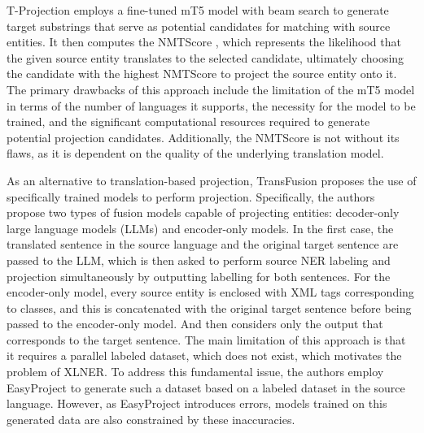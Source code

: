 T-Projection \cite{garcia-ferrero-etal-2023-projection} employs a fine-tuned mT5 \cite{xue-etal-2021-mt5}
model with beam search to generate target substrings that serve as potential candidates for matching
with source entities. It then computes the NMTScore \cite{vamvas_sennrich_2022_nmtscore}, which
represents the likelihood that the given source entity translates to the selected candidate, ultimately
choosing the candidate with the highest NMTScore to project the source entity onto it. The primary
drawbacks of this approach include the limitation of the mT5 model in terms of the number of languages
it supports, the necessity for the model to be trained, and the significant computational resources
required to generate potential projection candidates. Additionally, the NMTScore is not without its
flaws, as it is dependent on the quality of the underlying translation model.

As an alternative to translation-based projection, TransFusion \cite{transfusion} proposes the use of
specifically trained models to perform projection. Specifically, the authors propose two types of fusion
models capable of projecting entities: decoder-only large language models (LLMs) and encoder-only models.
In the first case, the translated sentence in the source language and the original target sentence are
passed to the LLM, which is then asked to perform source NER labeling and projection simultaneously
by outputting labelling for both sentences. For the encoder-only model, every source entity is enclosed
with XML tags corresponding to classes, and this is concatenated with the original target sentence
before being passed to the encoder-only model. And then considers only the output that corresponds to the
target sentence. The main limitation of this approach is that it requires a parallel labeled dataset,
which does not exist, which motivates the problem of XLNER. To address this fundamental issue, the
authors employ EasyProject to generate such a dataset based on a labeled dataset in the source
language. However, as EasyProject introduces errors, models trained on this generated data are also
constrained by these inaccuracies.

